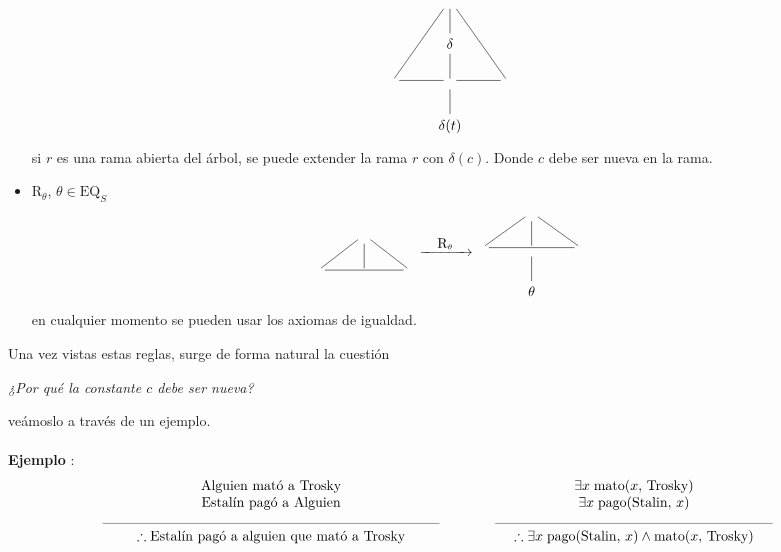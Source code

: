 \begin{itemize}
\[\begin{tikzcd}
                      & {} \arrow[d, no head] \arrow[ldd, no head] \arrow[rdd, no head] &    \\
                      & \delta \arrow[d, no head]                                       &    \\
{} \arrow[r, no head] & {} \arrow[r, no head] \arrow[d, no head]                        & {} \\
                      & \delta(t)                                                        &   
\end{tikzcd} \]
si $r$ es una rama abierta del árbol, se puede extender la rama $r$ con $\delta(c)$. Donde $c$ debe ser nueva en la rama.
\item $\mbox{R}_{\theta}$, $\theta \in \mbox{EQ}_S$ 
	\[\begin{tikzcd}
                                           & {} \arrow[d, no head] &                        \\
{} \arrow[ru, no head] \arrow[rr, no head] & {}                    & {} \arrow[lu, no head]
\end{tikzcd} \xrightarrow{\quad \mbox{R}_{\theta} \quad} \begin{tikzcd}
                                           & {} \arrow[d, no head] &                        \\
{} \arrow[ru, no head] \arrow[rr, no head] & {} \arrow[d, no head] & {} \arrow[lu, no head] \\
                                           & \theta               &                       
\end{tikzcd} \]
en cualquier momento se pueden usar los axiomas de igualdad. 
\end{itemize}

Una vez vistas estas reglas, surge de forma natural la cuestión 
\begin{center}
\textit{¿Por qué la constante $c$ debe ser nueva?}
\end{center}
veámoslo a través de un ejemplo.
\paragraph{}
\addtocounter{ej}{1} %
\textbf{Ejemplo }: 
\[ \begin{matrix}
\mbox{Alguien mató a Trosky}\\
 \mbox{Estalín pagó a Alguien} \\
 \rule{85mm}{0.1mm} \\
 \therefore \mbox{Estalín pagó a alguien que mató a Trosky}
\end{matrix} \qquad \qquad  \begin{matrix}
\exists x \; \mbox{mato}(x, \, \mbox{Trosky}) \\
 \exists x \; \mbox{pago}(\mbox{Stalin}, \, x) \\
 \rule{70mm}{0.1mm} \\
 \therefore \exists x \; \mbox{pago}(\mbox{Stalin}, \, x) \wedge \mbox{mato}(x, \, \mbox{Trosky}) 
\end{matrix}\]


